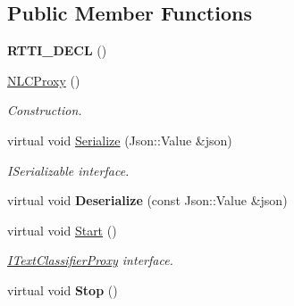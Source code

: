 \subsection*{Public Member Functions}
\begin{DoxyCompactItemize}
\item 
\mbox{\label{class_n_l_c_proxy_aef948eeebae5a59ad361bda2bb92b2ca}} 
{\bfseries R\+T\+T\+I\+\_\+\+D\+E\+CL} ()
\item 
\mbox{\label{class_n_l_c_proxy_aaf0a413b4d6d1af96227a8b6c836fadf}} 
\hyperlink{class_n_l_c_proxy_aaf0a413b4d6d1af96227a8b6c836fadf}{N\+L\+C\+Proxy} ()
\begin{DoxyCompactList}\small\item\em Construction. \end{DoxyCompactList}\item 
\mbox{\label{class_n_l_c_proxy_afcd182222e0e4de21d35ea50847961bb}} 
virtual void \hyperlink{class_n_l_c_proxy_afcd182222e0e4de21d35ea50847961bb}{Serialize} (Json\+::\+Value \&json)
\begin{DoxyCompactList}\small\item\em I\+Serializable interface. \end{DoxyCompactList}\item 
\mbox{\label{class_n_l_c_proxy_acdb5b09b6730ae885b9be5621dd059c3}} 
virtual void {\bfseries Deserialize} (const Json\+::\+Value \&json)
\item 
\mbox{\label{class_n_l_c_proxy_a6e419ce696a3852fd4ab40581d8202ff}} 
virtual void \hyperlink{class_n_l_c_proxy_a6e419ce696a3852fd4ab40581d8202ff}{Start} ()
\begin{DoxyCompactList}\small\item\em \hyperlink{class_i_text_classifier_proxy}{I\+Text\+Classifier\+Proxy} interface. \end{DoxyCompactList}\item 
\mbox{\label{class_n_l_c_proxy_a6ed40e0f2f9dcf4d696c405038e737d6}} 
virtual void {\bfseries Stop} ()
\item 
\mbox{\label{class_n_l_c_proxy_a5b874fb92d045cfe24cf44c9e2548a9d}} 

\end{DoxyCompactItemize}
